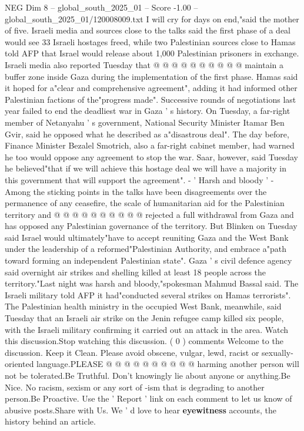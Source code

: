 \begin{textsample}{NEG Dim 8 – global\_south\_2025\_01 – Score -1.00 – global\_south\_2025\_01/120008009.txt}
I will cry for days on end,"said the mother of five.
Israeli media and sources close to the talks said the first phase of a deal would see 33 Israeli hostages freed, while two Palestinian sources close to Hamas told AFP that Israel would release about 1,000 Palestinian prisoners in exchange.
Israeli media also reported Tuesday that @ @ @ @ @ @ @ @ @ @ maintain a buffer zone inside Gaza during the implementation of the first phase.
Hamas said it hoped for a"clear and comprehensive agreement", adding it had informed other Palestinian factions of the"progress made".
Successive rounds of negotiations last year failed to end the deadliest war in Gaza ' s history.
On Tuesday, a far-right member of Netanyahu ' s government, National Security Minister Itamar Ben Gvir, said he opposed what he described as a"disastrous deal".
The day before, Finance Minister Bezalel Smotrich, also a far-right cabinet member, had warned he too would oppose any agreement to stop the war.
Saar, however, said Tuesday he believed"that if we will achieve this hostage deal we will have a majority in this government that will support the agreement". - ' Harsh and bloody ' - Among the sticking points in the talks have been disagreements over the permanence of any ceasefire, the scale of humanitarian aid for the Palestinian territory and @ @ @ @ @ @ @ @ @ @ rejected a full withdrawal from Gaza and has opposed any Palestinian governance of the territory.
But Blinken on Tuesday said Israel would ultimately"have to accept reuniting Gaza and the West Bank under the leadership of a reformed"Palestinian Authority, and embrace a"path toward forming an independent Palestinian state".
Gaza ' s civil defence agency said overnight air strikes and shelling killed at least 18 people across the territory."Last night was harsh and bloody,"spokesman Mahmud Bassal said.
The Israeli military told AFP it had"conducted several strikes on Hamas terrorists".
The Palestinian health ministry in the occupied West Bank, meanwhile, said Tuesday that an Israeli air strike on the Jenin refugee camp killed six people, with the Israeli military confirming it carried out an attack in the area.
Watch this discussion.Stop watching this discussion. ( 0 ) comments Welcome to the discussion.
Keep it Clean.
Please avoid obscene, vulgar, lewd, racist or sexually-oriented language.PLEASE @ @ @ @ @ @ @ @ @ @ harming another person will not be tolerated.Be Truthful.
Don't knowingly lie about anyone or anything.Be Nice.
No racism, sexism or any sort of -ism that is degrading to another person.Be Proactive.
Use the ' Report ' link on each comment to let us know of abusive posts.Share with Us.
We ' d love to hear \textbf{eyewitness} accounts, the history behind an article.

\end{textsample}
